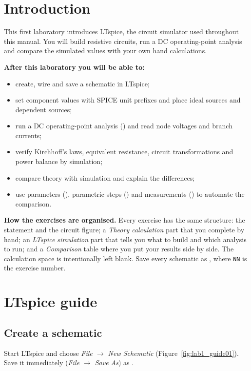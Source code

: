 
\section{Introduction}
This first laboratory introduces LTspice, the circuit simulator used throughout this manual. You will build resistive circuits, run a DC operating-point analysis and compare the simulated values with your own hand calculations.

\textbf{After this laboratory you will be able to:}
\begin{itemize}
  \item create, wire and save a schematic in LTspice;
  \item set component values with SPICE unit prefixes and place ideal sources and dependent sources;
  \item run a DC operating-point analysis () and read node voltages and branch currents;
  \item verify Kirchhoff's laws, equivalent resistance, circuit transformations and power balance by simulation;
  \item compare theory with simulation and explain the differences;
  \item use parameters (), parametric steps () and measurements () to automate the comparison.
\end{itemize}

\textbf{How the exercises are organised.} Every exercise has the same structure: the statement and the circuit figure; a \emph{Theory calculation} part that you complete by hand; an \emph{LTspice simulation} part that tells you what to build and which analysis to run; and a \emph{Comparison} table where you put your results side by side. The calculation space is intentionally left blank. Save every schematic as , where \texttt{NN} is the exercise number.

\section{LTspice guide}
\subsection{Create a schematic}
Start LTspice and choose \textit{File $\rightarrow$ New Schematic} (Figure~\ref{fig:lab1_guide01}). Save it immediately (\textit{File $\rightarrow$ Save As}) as .

